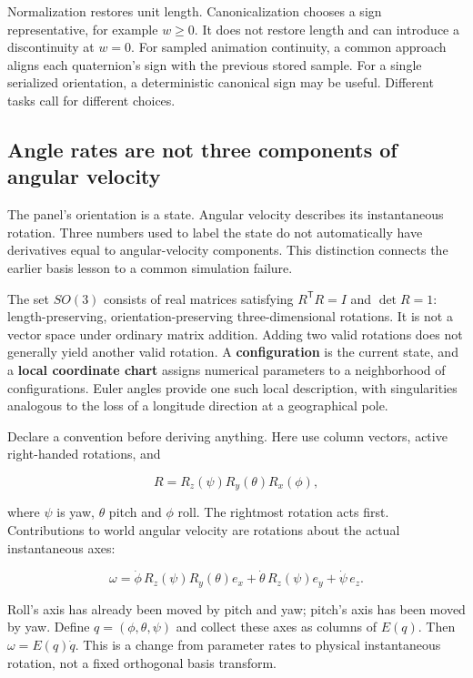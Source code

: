 Normalization restores unit length. Canonicalization chooses a sign representative, for example \(w\ge0\). It does not restore length and can introduce a discontinuity at \(w=0\). For sampled animation continuity, a common approach aligns each quaternion's sign with the previous stored sample. For a single serialized orientation, a deterministic canonical sign may be useful. Different tasks call for different choices.

\subsection{Angle rates are not three components of angular velocity}\label{01-foundations-i-ch019-angle-rates-are-not-three-components-of-angular-velocity}

The panel's orientation is a state. Angular velocity describes its instantaneous rotation. Three numbers used to label the state do not automatically have derivatives equal to angular-velocity components. This distinction connects the earlier basis lesson to a common simulation failure.

The set \(SO(3)\) consists of real matrices satisfying \(R^{\mathsf T}R=I\) and \(\det R=1\): length-preserving, orientation-preserving three-dimensional rotations. It is not a vector space under ordinary matrix addition. Adding two valid rotations does not generally yield another valid rotation. A \textbf{configuration} is the current state, and a \textbf{local coordinate chart} assigns numerical parameters to a neighborhood of configurations. Euler angles provide one such local description, with singularities analogous to the loss of a longitude direction at a geographical pole.

Declare a convention before deriving anything. Here use column vectors, active right-handed rotations, and

\[
R=R_z(\psi)R_y(\theta)R_x(\phi),
\]

where \(\psi\) is yaw, \(\theta\) pitch and \(\phi\) roll. The rightmost rotation acts first. Contributions to world angular velocity are rotations about the actual instantaneous axes:

\[
\omega=
\dot\phi\,R_z(\psi)R_y(\theta)e_x
+\dot\theta\,R_z(\psi)e_y
+\dot\psi\,e_z.
\]

Roll's axis has already been moved by pitch and yaw; pitch's axis has been moved by yaw. Define \(q=(\phi,\theta,\psi)\) and collect these axes as columns of \(E(q)\). Then \(\omega=E(q)\dot q\). This is a change from parameter rates to physical instantaneous rotation, not a fixed orthogonal basis transform.

